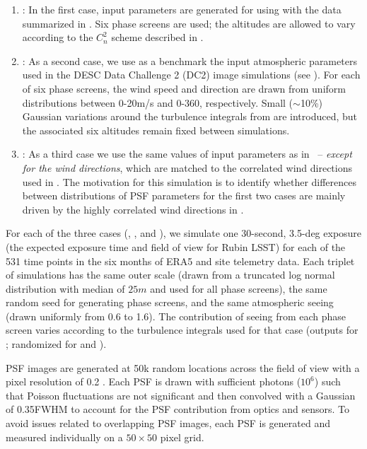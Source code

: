 \documentclass[twocolumn]{aastex631}
\begin{document}
\begin{enumerate}
\item \psfwssims:
In the first case, input parameters are generated for \cp using \psfws with the data summarized in .
Six phase screens are used; the altitudes are allowed to vary according to the $C_n^2$ scheme described in .

\item \bench:
As a second case, we use as a benchmark the input atmospheric parameters used in the DESC Data Challenge 2 (DC2) image simulations (see \dcii).
For each of six phase screens, the wind speed and direction are drawn from uniform distributions between 0-20\unit{m/s} and 0-360\degree, respectively.
Small ($\sim$10\%) Gaussian variations around the turbulence integrals from \cite{ellerbroek_efficient_2002} are introduced, but the associated six altitudes remain fixed between simulations.


\item \match: 
As a third case we use the same values of input parameters as in \bench\ -- \textit{except for the wind directions}, which are matched to the correlated wind directions used in \psfwssims.
The motivation for this \match simulation is to identify whether differences between distributions of PSF parameters for the first two cases are mainly driven by the highly correlated wind directions in \psfws.
\end{enumerate}

For each of the three cases (\psfwssims, \bench, and \match), we simulate one 30-second, 3.5-deg exposure (the expected exposure time and field of view for Rubin LSST) for each of the 531 time points in the six months of ERA5 and site telemetry data. 
Each triplet of simulations has the same outer scale (drawn from a truncated log normal distribution with median of $25\unit{m}$ and used for all phase screens), the same random seed for generating phase screens, and the same atmospheric seeing (drawn uniformly from 0.6 to 1.6\asec). 
The contribution of seeing from each phase screen varies according to the turbulence integrals used for that case (\psfws outputs for \psfwssims; randomized \cite{ellerbroek_efficient_2002} for \bench and \match).

PSF images are generated at 50k random locations across the field of view with a pixel resolution of 0.2 \asec. 
Each PSF is drawn with sufficient photons ($10^6$) such that Poisson fluctuations are not significant and then convolved with a Gaussian of 0.35\asec FWHM to account for the PSF contribution from optics and sensors.
To avoid issues related to overlapping PSF images, each PSF is generated and measured individually on a $50\times50$ pixel grid.
\end{document}
